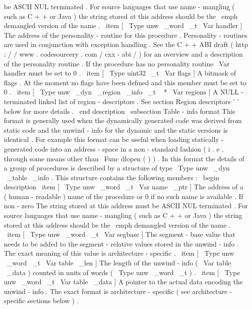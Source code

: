 be
ASCII
NUL
terminated
.
For
source
languages
that
use
name
-
mangling
(
such
as
C
+
+
or
Java
)
the
string
stored
at
this
address
should
be
the
\
emph
{
demangled
}
version
of
the
name
.
\
item
[
\
Type
{
unw
\
_word
\
_t
}
\
Var
{
handler
}
]
The
address
of
the
personality
-
routine
for
this
procedure
.
Personality
-
routines
are
used
in
conjunction
with
exception
handling
.
See
the
C
+
+
ABI
draft
(
http
:
/
/
www
.
codesourcery
.
com
/
cxx
-
abi
/
)
for
an
overview
and
a
description
of
the
personality
routine
.
If
the
procedure
has
no
personality
routine
\
Var
{
handler
}
must
be
set
to
0
.
\
item
[
\
Type
{
uint32
\
_t
}
\
Var
{
flags
}
]
A
bitmask
of
flags
.
At
the
moment
no
flags
have
been
defined
and
this
member
must
be
set
to
0
.
\
item
[
\
Type
{
unw
\
_dyn
\
_region
\
_info
\
_t
~
*
}
\
Var
{
regions
}
]
A
NULL
-
terminated
linked
list
of
region
-
descriptors
.
See
section
Region
descriptors
'
'
below
for
more
details
.
\
end
{
description
}
\
subsection
{
Table
-
info
format
}
This
format
is
generally
used
when
the
dynamically
generated
code
was
derived
from
static
code
and
the
unwind
-
info
for
the
dynamic
and
the
static
versions
is
identical
.
For
example
this
format
can
be
useful
when
loading
statically
-
generated
code
into
an
address
-
space
in
a
non
-
standard
fashion
(
i
.
e
.
through
some
means
other
than
\
Func
{
dlopen
}
(
)
)
.
In
this
format
the
details
of
a
group
of
procedures
is
described
by
a
structure
of
type
\
Type
{
unw
\
_dyn
\
_table
\
_info
}
.
This
structure
contains
the
following
members
:
\
begin
{
description
}
\
item
[
\
Type
{
unw
\
_word
\
_t
}
\
Var
{
name
\
_ptr
}
]
The
address
of
a
(
human
-
readable
)
name
of
the
procedure
or
0
if
no
such
name
is
available
.
If
non
-
zero
The
string
stored
at
this
address
must
be
ASCII
NUL
terminated
.
For
source
languages
that
use
name
-
mangling
(
such
as
C
+
+
or
Java
)
the
string
stored
at
this
address
should
be
the
\
emph
{
demangled
}
version
of
the
name
.
\
item
[
\
Type
{
unw
\
_word
\
_t
}
\
Var
{
segbase
}
]
The
segment
-
base
value
that
needs
to
be
added
to
the
segment
-
relative
values
stored
in
the
unwind
-
info
.
The
exact
meaning
of
this
value
is
architecture
-
specific
.
\
item
[
\
Type
{
unw
\
_word
\
_t
}
\
Var
{
table
\
_len
}
]
The
length
of
the
unwind
-
info
(
\
Var
{
table
\
_data
}
)
counted
in
units
of
words
(
\
Type
{
unw
\
_word
\
_t
}
)
.
\
item
[
\
Type
{
unw
\
_word
\
_t
}
\
Var
{
table
\
_data
}
]
A
pointer
to
the
actual
data
encoding
the
unwind
-
info
.
The
exact
format
is
architecture
-
specific
(
see
architecture
-
specific
sections
below
)
.
\
